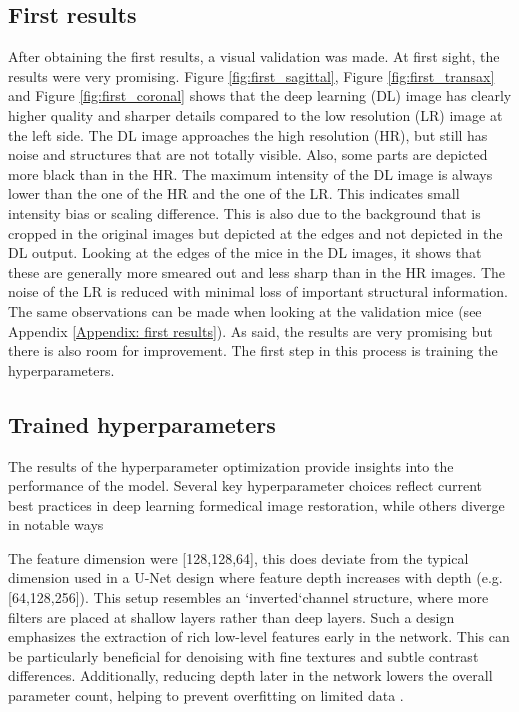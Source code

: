 \documentclass[twocolumn]{article}
\begin{document}
\subsection{First results}
After obtaining the first results, a visual validation was made. At first sight, the results were very promising. 
Figure \ref{fig:first_sagittal}, Figure \ref{fig:first_transax} and Figure \ref{fig:first_coronal} shows that the deep learning (DL) image has clearly higher quality and sharper details compared to the low resolution (LR) image at the left side. 
The DL image approaches the high resolution (HR), but still has noise and structures that are not totally visible. 
Also, some parts are depicted more black than in the HR.
The maximum intensity of the DL image is always lower than the one of the HR and the one of the LR. 
This indicates small intensity bias or scaling difference. This is also due to the background that is cropped in the original images but depicted at the edges and not depicted in the DL output. 
Looking at the edges of the mice in the DL images, it shows that these are generally more smeared out and less sharp than in the HR images. 
The noise of the LR is reduced with minimal loss of important structural information. 
The same observations can be made when looking at the validation mice (see Appendix \ref{Appendix: first results}).
As said, the results are very promising but there is also room for improvement. The first step in this process is training the hyperparameters. 

\subsection{Trained hyperparameters}
The results of the hyperparameter optimization provide insights into the performance of the model. 
Several key hyperparameter choices reflect current best practices in deep learning formedical image restoration, while others diverge in notable ways

The feature dimension were [128,128,64], this does deviate from the typical dimension used in a U-Net design where feature depth increases with depth (e.g. [64,128,256]).
This setup resembles an `inverted`channel structure, where more filters are placed at shallow layers rather than deep layers.
Such a design emphasizes the extraction of rich low-level features early in the network. 
This can be particularly beneficial for denoising with fine textures and subtle contrast differences. 
Additionally, reducing depth later in the network lowers the overall parameter count, helping to prevent overfitting on limited data \cite{features}. 
\end{document}
